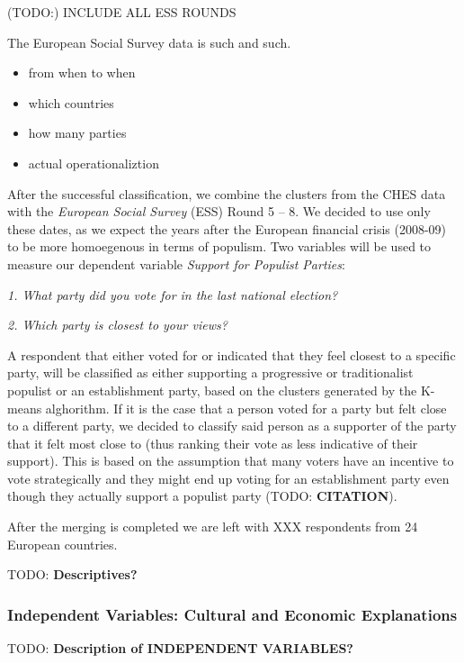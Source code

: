 \documentclass[]{article}
\providecommand{\tightlist}{%
  \setlength{\itemsep}{0pt}\setlength{\parskip}{0pt}}
\begin{document}
(TODO:) INCLUDE ALL ESS ROUNDS

The European Social Survey data is such and such.

\begin{itemize}
\tightlist
\item
  from when to when
\item
  which countries
\item
  how many parties
\item
  actual operationaliztion
\end{itemize}

After the successful classification, we combine the clusters from the
CHES data with the \emph{European Social Survey} (ESS) Round 5 -- 8. We
decided to use only these dates, as we expect the years after the
European financial crisis (2008-09) to be more homoegenous in terms of
populism. Two variables will be used to measure our dependent variable
\emph{Support for Populist Parties}:

\emph{1. What party did you vote for in the last national election?}

\emph{2. Which party is closest to your views?}

A respondent that either voted for or indicated that they feel closest
to a specific party, will be classified as either supporting a
progressive or traditionalist populist or an establishment party, based
on the clusters generated by the K-means alghorithm. If it is the case
that a person voted for a party but felt close to a different party, we
decided to classify said person as a supporter of the party that it felt
most close to (thus ranking their vote as less indicative of their
support). This is based on the assumption that many voters have an
incentive to vote strategically and they might end up voting for an
establishment party even though they actually support a populist party
(TODO: \textbf{CITATION}).

After the merging is completed we are left with XXX respondents from 24
European countries.

TODO: \textbf{Descriptives?}

\subsubsection{Independent Variables: Cultural and Economic
Explanations}\label{independent-variables-cultural-and-economic-explanations}

TODO: \textbf{Description of INDEPENDENT VARIABLES?}
\end{document}
